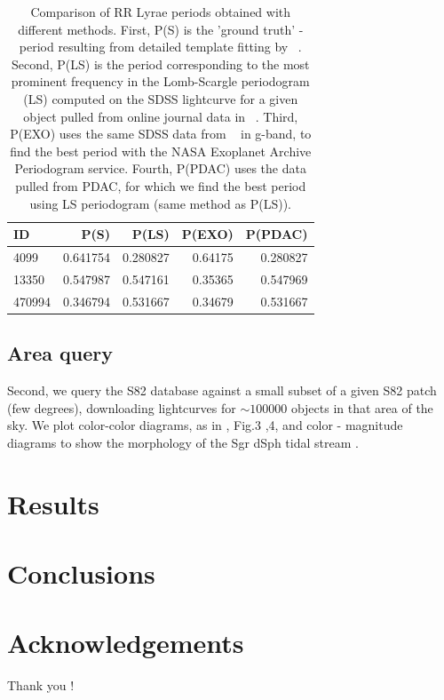 \documentclass[fleqn,usenatbib]{mnras} %
\begin{document}
\begin{table}
\centering
\caption{Comparison of RR Lyrae periods obtained with different methods. First, P(S) is the 'ground truth' -  period resulting from detailed template fitting by ~\citep{sesar2010}. Second, P(LS) is the period corresponding to the most prominent frequency in the Lomb-Scargle periodogram  (LS) computed on the SDSS lightcurve for a given object pulled from online journal data in ~\citep{sesar2010}. Third, P(EXO) uses the same SDSS data from ~\citep{sesar2010} in g-band, to find the best period with the NASA Exoplanet Archive Periodogram service.  Fourth, P(PDAC) uses the data pulled from PDAC, for which we find  the best period using  LS periodogram (same method as P(LS)).}
\label{tab:periods}
\begin{tabular}{ l|rrrr } 
\hline
 ID      & P(S)         & P(LS)      & P(EXO)       & P(PDAC) \\ 
\hline
 4099    & 0.641754     & 0.280827   & 0.64175      &  0.280827 \\ 
 13350   & 0.547987     & 0.547161   & 0.35365      &  0.547969  \\ 
 470994  & 0.346794     & 0.531667   & 0.34679      &  0.531667  \\ 
\end{tabular}
\end{table}


\subsection{Area query}

Second, we query the S82 database against a small subset of a given S82 patch (few degrees), downloading lightcurves for $\sim100 000 $ objects in that area of the sky. We plot color-color diagrams, as in \cite{sesar2007}, Fig.3 ,4, and color - magnitude diagrams to show the morphology of the Sgr dSph tidal stream \citep{sesar2010}.  





\section{Results}

\section{Conclusions}

\section*{Acknowledgements}
Thank you ! 
\end{document}
